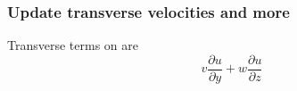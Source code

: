 \documentclass{article}
\numberwithin{equation}{subsection}
\begin{document}

\subsubsection{Update transverse velocities and more}
Transverse terms on  are
\begin{equation}
    v\frac{\partial u}{\partial y} + w\frac{\partial u}{\partial z}
\end{equation}
\end{document}
